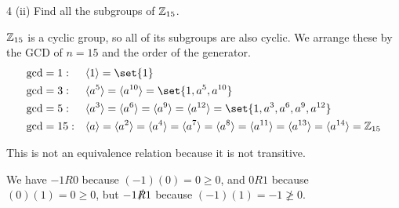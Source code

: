 \documentclass[11pt]{penrose}
\begin{document}
\begin{problem}{4 (ii)}
    Find all the subgroups of $\mathbb{Z}_{15}$.

    \solution $\mathbb{Z}_{15}$ is a cyclic group, so all of its subgroups are also cyclic. We arrange these by the GCD of $n = 15$ and the order of the generator.
    \begin{equation*}
    \begin{aligned}
        \gcd &= 1:  & & \cyclic{1}   = \set{1}\\
        \gcd &= 3:  & & \cyclic{a^5} = \cyclic{a^{10}} = \set{1, a^5, a^{10}}\\
        \gcd &= 5:  & & \cyclic{a^3} = \cyclic{a^6} = \cyclic{a^9} = \cyclic{a^{12}} = \set{1, a^3, a^6, a^9, a^{12}}\\
        \gcd &= 15: & & \cyclic{a} = \cyclic{a^2} = \cyclic{a^4} = \cyclic{a^7} = \cyclic{a^8} = \cyclic{a^{11}} = \cyclic{a^{13}} = \cyclic{a^{14}} = \Z_{15}
    \end{aligned}
    \end{equation*}
\end{problem}

\begin{problem}{5}

    This is not an equivalence relation because it is not transitive.

    We have $-1 R 0$ because $(-1)(0) = 0 \geq 0$, and $0 R 1$ because $(0)(1) = 0 \geq 0$, but $-1 \slashed{R} 1$ because $(-1)(1) = -1 \ngeq 0$.
\end{problem}
\end{document}
